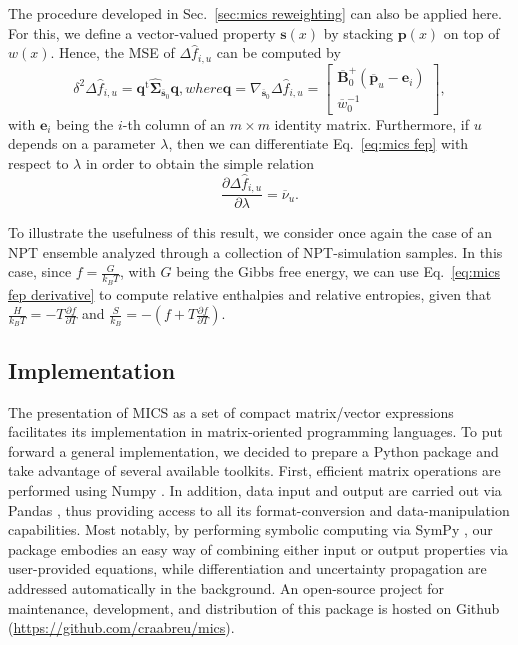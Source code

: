 \documentclass[journal=jctcce,manuscript=article,layout=twocolumn]{achemso}
\newcommand{\mt}[1]{\boldsymbol{\mathbf{#1}}}   %
\newcommand{\vt}[1]{\boldsymbol{\mathbf{#1}}}   %
\newcommand{\tr}[1]{#1^\text{t}}                %
\newcommand{\diff}[2]{\frac{\partial #1}{\partial #2}} %
\newcommand{\avg}[1]{\overline{#1}}             %
\begin{document}
The procedure developed in Sec.~\ref{sec:mics reweighting} can also be applied here. For this, we define a vector-valued property $\vt s(x)$ by stacking $\vt p(x)$ on top of $w(x)$. Hence, the MSE of $\Delta {\hat f}_{i,u}$ can be computed by
\begin{subequations}
	\label{eq:mics fep uncertainty}
	\begin{equation}
	\label{eq:mics fep delta method}
	\delta^2 \Delta {\hat f}_{i,u} = \tr{\vt q} \hat{\mt \Sigma}_{\avg{\vt s}_0} {\vt q},
	\end{equation}
	where
	\begin{equation}
	\label{eq:mics fep gradient}
	{\vt q} = \nabla_{\avg{\vt s}_0} \Delta {\hat f}_{i,u} =
	\left[\begin{array}{c}
	\avg{\mt B}_0^+  (\avg{\vt p}_u - {\vt e}_i) \\
	\avg{w}_0^{-1}
	\end{array}\right],
	\end{equation}
\end{subequations}
with $\vt e_i$ being the $i$-th column of an $m \times m$ identity matrix. Furthermore, if $u$ depends on a parameter $\lambda$, then we can differentiate Eq.~\eqref{eq:mics fep} with respect to $\lambda$ in order to obtain the simple relation
\begin{equation}
\label{eq:mics fep derivative}
\diff{\Delta {\hat f}_{i,u}}{\lambda} = \avg{\nu}_u.
\end{equation}

To illustrate the usefulness of this result, we consider once again the case of an NPT ensemble analyzed through a collection of NPT-simulation samples. In this case, since $f = \frac{G}{k_B T}$, with $G$ being the Gibbs free energy, we can use Eq.~\eqref{eq:mics fep derivative} to compute relative enthalpies and relative entropies, given that $\frac{H}{k_B T} = - T \frac{\partial f}{\partial T}$ and $\frac{S}{k_B} = -(f + T \frac{\partial f}{\partial T})$.

\subsection{Implementation}

The presentation of MICS as a set of compact matrix/vector expressions facilitates its implementation in matrix-oriented programming languages. To put forward a general implementation, we decided to prepare a Python package and take advantage of several available toolkits. First, efficient matrix operations are performed using Numpy \cite{Van_der_walt_2011}. In addition, data input and output are carried out via Pandas \cite{Mckinney_2010}, thus providing access to all its format-conversion and data-manipulation capabilities. Most notably, by performing symbolic computing via SymPy \cite{Meurer_2017}, our package embodies an easy way of combining either input or output properties via user-provided equations, while differentiation and uncertainty propagation are addressed automatically in the background. An open-source project for maintenance, development, and distribution of this package is hosted on Github  (\url{https://github.com/craabreu/mics}).
\end{document}
